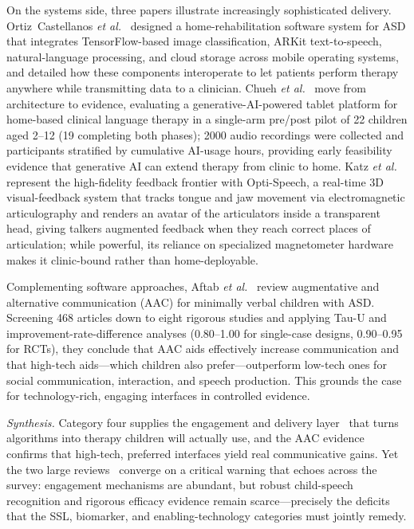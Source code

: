 \documentclass[conference]{IEEEtran}
\begin{document}
On the systems side, three papers illustrate increasingly sophisticated delivery. Ortiz~Castellanos \textit{et al.}~\cite{ref14} designed a home-rehabilitation software system for ASD that integrates TensorFlow-based image classification, ARKit text-to-speech, natural-language processing, and cloud storage across mobile operating systems, and detailed how these components interoperate to let patients perform therapy anywhere while transmitting data to a clinician. Chueh \textit{et al.}~\cite{ref15} move from architecture to evidence, evaluating a generative-AI-powered tablet platform for home-based clinical language therapy in a single-arm pre/post pilot of 22 children aged 2--12 (19 completing both phases); 2000 audio recordings were collected and participants stratified by cumulative AI-usage hours, providing early feasibility evidence that generative AI can extend therapy from clinic to home. Katz \textit{et al.}~\cite{ref16} represent the high-fidelity feedback frontier with Opti-Speech, a real-time 3D visual-feedback system that tracks tongue and jaw movement via electromagnetic articulography and renders an avatar of the articulators inside a transparent head, giving talkers augmented feedback when they reach correct places of articulation; while powerful, its reliance on specialized magnetometer hardware makes it clinic-bound rather than home-deployable.

Complementing software approaches, Aftab \textit{et al.}~\cite{ref17} review augmentative and alternative communication (AAC) for minimally verbal children with ASD. Screening 468 articles down to eight rigorous studies and applying Tau-U and improvement-rate-difference analyses (0.80--1.00 for single-case designs, 0.90--0.95 for RCTs), they conclude that AAC aids effectively increase communication and that high-tech aids---which children also prefer---outperform low-tech ones for social communication, interaction, and speech production. This grounds the case for technology-rich, engaging interfaces in controlled evidence.

\emph{Synthesis.} Category four supplies the engagement and delivery layer~\cite{ref12,ref13,ref14,ref15,ref16,ref17} that turns algorithms into therapy children will actually use, and the AAC evidence~\cite{ref17} confirms that high-tech, preferred interfaces yield real communicative gains. Yet the two large reviews~\cite{ref12,ref13} converge on a critical warning that echoes across the survey: engagement mechanisms are abundant, but robust child-speech recognition and rigorous efficacy evidence remain scarce---precisely the deficits that the SSL, biomarker, and enabling-technology categories must jointly remedy.
\end{document}
